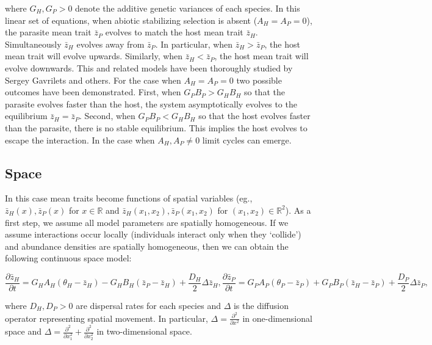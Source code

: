 \documentclass{article}
\begin{document}
where \(G_H,G_P>0\) denote the additive genetic variances of each
species. In this linear set of equations, when abiotic stabilizing
selection is absent (\(A_H=A_P=0\)), the parasite mean trait
\(\bar z_P\) evolves to match the host mean trait \(\bar z_H\).
Simultaneously \(\bar z_H\) evolves away from \(\bar z_P\). In
particular, when \(\bar z_H>\bar z_P\), the host mean trait will evolve
upwards. Similarly, when \(\bar z_H<\bar z_P\), the host mean trait will
evolve downwards. This and related models have been thoroughly studied
by Sergey Gavrilets and others. For the case when \(A_H=A_P=0\) two
possible outcomes have been demonstrated. First, when \(G_PB_P>G_HB_H\)
so that the parasite evolves faster than the host, the system
asymptotically evolves to the equilibrium \(\bar z_H=\bar z_P\). Second,
when \(G_PB_P<G_HB_H\) so that the host evolves faster than the
parasite, there is no stable equilibrium. This implies the host evolves
to escape the interaction. In the case when \(A_H,A_P\neq0\) limit
cycles can emerge.

\hypertarget{space}{%
\subsection{Space}\label{space}}

In this case mean traits become functions of spatial variables (eg.,
\(\bar z_H(x),\bar z_P(x)\) for \(x\in\mathbb R\) and
\(\bar z_H(x_1,x_2),\bar z_P(x_1,x_2)\) for
\((x_1,x_2)\in\mathbb R^2\)). As a first step, we assume all model
parameters are spatially homogeneous. If we assume interactions occur
locally (individuals interact only when they `collide') and abundance
densities are spatially homogeneous, then we can obtain the following
continuous space model:

\begin{subequations}\label{deterministic}
  \begin{equation}
    \frac{\partial\bar z_H}{\partial t}=G_HA_H(\theta_H-\bar z_H)-G_HB_H(\bar z_P-\bar z_H)+\frac{D_H}{2}\Delta\bar z_H,
  \end{equation}
  \begin{equation}
    \frac{\partial\bar z_P}{\partial t}=G_PA_P(\theta_P-\bar z_P)+G_PB_P(\bar z_H-\bar z_P)+\frac{D_P}{2}\Delta\bar z_P,
  \end{equation}
\end{subequations}

where \(D_H,D_P>0\) are dispersal rates for each species and \(\Delta\)
is the diffusion operator representing spatial movement. In particular,
\(\Delta=\frac{\partial^2}{\partial x^2}\) in one-dimensional space and
\(\Delta=\frac{\partial^2}{\partial x_1^2}+\frac{\partial^2}{\partial x_2^2}\)
in two-dimensional space.
\end{document}
